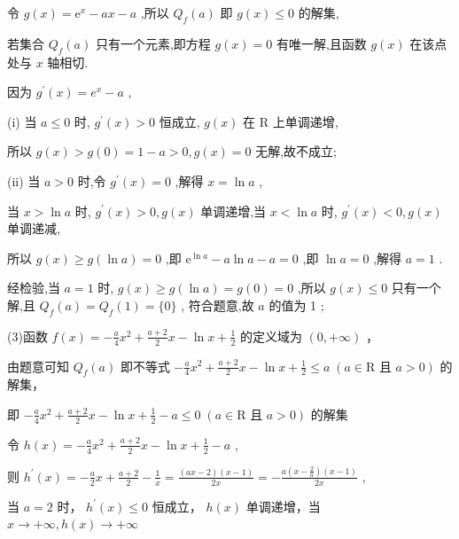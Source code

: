 \documentclass[10pt]{article}
\newcommand*\circled[1]{\tikz[baseline=(char.base)]{\node[shape=circle,draw,inner sep=1.5pt] (char) {\small #1};}}
\begin{document}
令 \(g\left( x\right)  = {\mathrm{e}}^{x} - {ax} - a\) ,所以 \({Q}_{f}\left( a\right)\) 即 \(g\left( x\right)  \leq  0\) 的解集,

若集合 \({Q}_{f}\left( a\right)\) 只有一个元素,即方程 \(g\left( x\right)  = 0\) 有唯一解,且函数 \(g\left( x\right)\) 在该点处与 \(x\) 轴相切.

因为 \({g}^{\prime }\left( x\right)  = {e}^{x} - a\) ,

(i) 当 \(a \leq  0\) 时, \({g}^{\prime }\left( x\right)  > 0\) 恒成立, \(g\left( x\right)\) 在 \(\mathrm{R}\) 上单调递增,

所以 \(g\left( x\right)  > g\left( 0\right)  = 1 - a > 0,g\left( x\right)  = 0\) 无解,故不成立;

(ii) 当 \(a > 0\) 时,令 \({g}^{\prime }\left( x\right)  = 0\) ,解得 \(x = \ln a\) ,

当 \(x > \ln a\) 时, \({g}^{\prime }\left( x\right)  > 0,g\left( x\right)\) 单调递增,当 \(x < \ln a\) 时, \({g}^{\prime }\left( x\right)  < 0,g\left( x\right)\) 单调递减,

所以 \(g\left( x\right)  \geq  g\left( {\ln a}\right)  = 0\) ,即 \({\mathrm{e}}^{\ln a} - a\ln a - a = 0\) ,即 \(\ln a = 0\) ,解得 \(a = 1\) .

经检验,当 \(a = 1\) 时, \(g\left( x\right)  \geq  g\left( {\ln a}\right)  = g\left( 0\right)  = 0\) ,所以 \(g\left( x\right)  \leq  0\) 只有一个解,且 \({Q}_{f}\left( a\right)  = {Q}_{f}\left( 1\right)  = \{ 0\}\) , 符合题意,故 \(a\) 的值为 1 ;

(3)函数 \(f\left( x\right)  =  - \frac{a}{4}{x}^{2} + \frac{a + 2}{2}x - \ln x + \frac{1}{2}\) 的定义域为 \(\left( {0, + \infty }\right)\) ，

由题意可知 \({Q}_{f}\left( a\right)\) 即不等式 \(- \frac{a}{4}{x}^{2} + \frac{a + 2}{2}x - \ln x + \frac{1}{2} \leq  a\;\left( {a \in  \mathrm{R}\text{ 且 }a > 0}\right)\) 的解集，

即 \(- \frac{a}{4}{x}^{2} + \frac{a + 2}{2}x - \ln x + \frac{1}{2} - a \leq  0\;\left( {a \in  \mathrm{R}\text{ 且 }a > 0}\right)\) 的解集

令 \(h\left( x\right)  =  - \frac{a}{4}{x}^{2} + \frac{a + 2}{2}x - \ln x + \frac{1}{2} - a\) ,

则 \({h}^{\prime }\left( x\right)  =  - \frac{a}{2}x + \frac{a + 2}{2} - \frac{1}{x} = \frac{\left( {{ax} - 2}\right) \left( {x - 1}\right) }{2x} =  - \frac{a\left( {x - \frac{2}{a}}\right) \left( {x - 1}\right) }{2x}\) ,

 \circled{1}  当 \(a = 2\) 时， \({h}^{\prime }\left( x\right)  \leq  0\) 恒成立， \(h\left( x\right)\) 单调递增，当 \(x \rightarrow   + \infty ,h\left( x\right)  \rightarrow   + \infty\)
\end{document}
